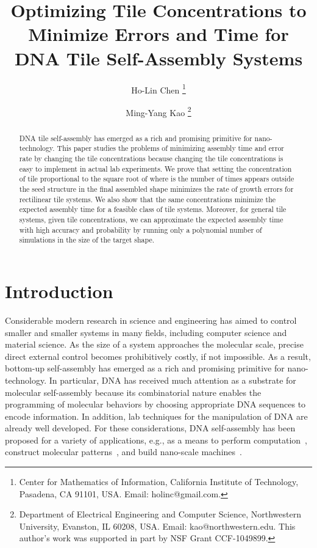 \documentclass[11pt]{article}
\begin{document}
\title{Optimizing Tile Concentrations to Minimize Errors and Time for DNA Tile
Self-Assembly Systems}
\author{
Ho-Lin Chen
\thanks{
Center for Mathematics of Information, California Institute of Technology, Pasadena, CA 91101, USA. Email: holinc@gmail.com.}
\and Ming-Yang Kao
\thanks{Department of Electrical Engineering and Computer Science,
Northwestern University, Evanston, IL 60208, USA. Email: kao@northwestern.edu. This author's work was supported in part by NSF Grant CCF-1049899.}
}
\date{}

\begin{titlepage}
\maketitle
\thispagestyle{empty}
\begin{abstract} 
  \small\baselineskip=12pt
DNA tile self-assembly has emerged as a rich and promising primitive for nano-technology. This paper studies the problems of minimizing assembly time and error rate by changing the tile concentrations because changing the tile concentrations is easy to implement in actual lab experiments. We prove that setting the concentration of tile  proportional to the square root of  where  is the number of times  appears outside the seed structure in the final assembled shape minimizes the rate of growth errors for rectilinear tile systems. We also show that the same concentrations minimize the expected assembly time for a feasible class of tile systems. Moreover, for general tile systems, given tile concentrations, we can approximate the expected assembly time with high accuracy and probability by running only a polynomial number of simulations in the size of the target shape.
 
 
\end{abstract}
\end{titlepage}

\section{Introduction}


Considerable modern research in science and engineering has aimed to control smaller and smaller systems in many fields, including computer science and material science. As the size of a system approaches the molecular scale, precise direct external control becomes prohibitively costly, if not impossible. As a result, bottom-up self-assembly has emerged as a rich and promising primitive for nano-technology. In particular, DNA has received much attention as a substrate for molecular self-assembly because its combinatorial nature enables the programming of molecular behaviors by choosing appropriate DNA sequences to encode information. In addition, lab techniques for the manipulation of DNA are already well developed. For these considerations, DNA self-assembly has been proposed for a variety of applications, e.g., as a means to perform computation~\cite{brw05:counter,w98:phd,sszw06:circuits}, construct molecular patterns~\cite{rpe04:sierexp,r06:origami,zs94:octahedron,sqj04:octahedron,ddlhgs09:3D_origami,hdw:twisted_origami}, and build nano-scale machines~\cite{ytmsn00:tweezer,ss04:walker,sp04:walker,bk07:tweezer,gbt08_walker,ds06:3dcasette}.
\end{document}
